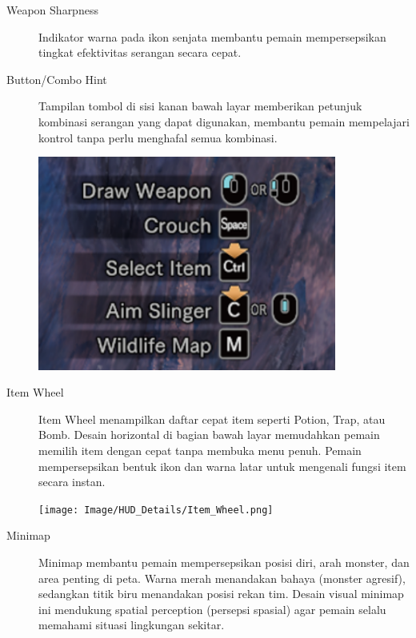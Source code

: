\documentclass[12pt]{article}
\begin{document}
\begin{description}
    \item[Weapon Sharpness] Indikator warna pada ikon senjata membantu pemain mempersepsikan tingkat efektivitas serangan secara cepat.

    \item[Button/Combo Hint] Tampilan tombol di sisi kanan bawah layar memberikan petunjuk kombinasi serangan yang dapat digunakan, membantu pemain mempelajari kontrol tanpa perlu menghafal semua kombinasi.
      
    \begin{center}
        \includegraphics[width=0.8\textwidth]{Image/HUD_Details/Button_Hint.png}
    \end{center}

    \item[Item Wheel] Item Wheel menampilkan daftar cepat item seperti Potion, Trap, atau Bomb. Desain horizontal di bagian bawah layar memudahkan pemain memilih item dengan cepat tanpa membuka menu penuh. Pemain mempersepsikan bentuk ikon dan warna latar untuk mengenali fungsi item secara instan.
    
    \begin{center}
        \texttt{[image: Image/HUD\_Details/Item\_Wheel.png]}
    \end{center}

    \item[Minimap] Minimap membantu pemain mempersepsikan posisi diri, arah monster, dan area penting di peta. Warna merah menandakan bahaya (monster agresif), sedangkan titik biru menandakan posisi rekan tim.  
    Desain visual minimap ini mendukung spatial perception (persepsi spasial) agar pemain selalu memahami situasi lingkungan sekitar.


\end{description}
\end{document}
